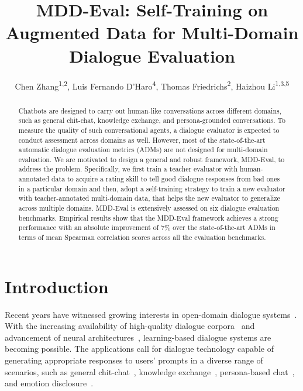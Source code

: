 \documentclass[letterpaper]{article} \usepackage{aaai22}  \usepackage{times}  \usepackage{helvet}  \usepackage{courier}  \usepackage[hyphens]{url}  \usepackage{graphicx} \urlstyle{rm} \def\UrlFont{\rm}  \usepackage{natbib}  \usepackage{caption} \DeclareCaptionStyle{ruled}{labelfont=normalfont,labelsep=colon,strut=off} \frenchspacing  \setlength{\pdfpagewidth}{8.5in}  \setlength{\pdfpageheight}{11in}  \usepackage{algorithm}
\title{MDD-Eval: Self-Training on Augmented Data for Multi-Domain Dialogue Evaluation}
\author {
Chen Zhang\textsuperscript{\rm 1,2},
    Luis Fernando D’Haro\textsuperscript{\rm 4},
    Thomas Friedrichs\textsuperscript{\rm 2},
    Haizhou Li\textsuperscript{\rm 1,3,5}
}
\begin{document}
\maketitle

\begin{abstract}
Chatbots are designed to carry out human-like conversations across different domains, such as general chit-chat, knowledge exchange, and persona-grounded conversations. To measure the quality of such conversational agents, a dialogue evaluator is expected to conduct assessment across domains as well. However, most of the state-of-the-art automatic dialogue evaluation metrics (ADMs) are not designed for multi-domain evaluation. We are motivated to design a general and robust framework, MDD-Eval, to address the problem. Specifically, we first train a teacher evaluator with human-annotated data to acquire a rating skill to tell good dialogue responses from bad ones in a particular domain and then, adopt a self-training strategy to train a new evaluator with teacher-annotated multi-domain data, that helps the new evaluator to generalize across multiple domains. MDD-Eval is extensively assessed on six dialogue evaluation benchmarks. Empirical results show that the MDD-Eval framework achieves a strong performance with an absolute improvement of 7\% over the state-of-the-art ADMs in terms of mean Spearman correlation scores across all the evaluation benchmarks.   
\end{abstract} 










\section{Introduction}
\label{sec:intro}

Recent years have witnessed growing interests in open-domain dialogue systems~\citep{adiwardana2020towards,zhang-etal-2020-dialogpt,roller-etal-2021-recipes}. With the increasing availability of high-quality dialogue corpora~\citep{li-etal-2017-dailydialog,zhang-etal-2018-personalizing} and advancement of neural architectures~\citep{devlin2019bert,radford2019language}, learning-based dialogue systems are becoming possible. The applications call for  dialogue technology capable of generating appropriate responses to users' prompts in a diverse range of scenarios, such as general chit-chat~\citep{li-etal-2017-dailydialog}, knowledge exchange~\citep{gopalakrishnan2019topical}, persona-based chat~\citep{zhang-etal-2018-personalizing}, and emotion disclosure~\citep{rashkin-etal-2019-towards}.  
\end{document}
